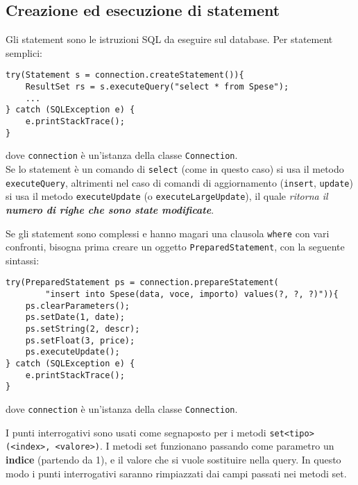 \documentclass[a4paper, 10pt, titlepage]{article}
\begin{document}
\subsection{Creazione ed esecuzione di statement}
Gli statement sono le istruzioni SQL da eseguire sul database. Per statement semplici:
\begin{lstlisting}
try(Statement s = connection.createStatement()){
	ResultSet rs = s.executeQuery("select * from Spese");
	...
} catch (SQLException e) {
	e.printStackTrace();
}
\end{lstlisting}
dove \lstinline|connection| è un'istanza della classe \lstinline|Connection|. \\
Se lo statement è un comando di \lstinline|select| (come in questo caso) si usa il metodo \lstinline|executeQuery|, altrimenti nel caso di comandi di aggiornamento (\lstinline|insert|, \lstinline|update|) si usa il metodo \lstinline|executeUpdate| (o \lstinline|executeLargeUpdate|), il quale \textit{ritorna il \textbf{numero di righe che sono state modificate}}.\medskip

Se gli statement sono complessi e hanno magari una clausola \lstinline|where| con vari confronti, bisogna prima creare un oggetto \lstinline|PreparedStatement|, con la seguente sintassi:

\begin{lstlisting}
try(PreparedStatement ps = connection.prepareStatement(
		"insert into Spese(data, voce, importo) values(?, ?, ?)")){	
	ps.clearParameters();	
	ps.setDate(1, date);
	ps.setString(2, descr);
	ps.setFloat(3, price);
	ps.executeUpdate();
} catch (SQLException e) {
	e.printStackTrace();
}
\end{lstlisting}
dove \lstinline|connection| è un'istanza della classe \lstinline|Connection|. 

I punti interrogativi sono usati come segnaposto per i metodi \lstinline|set<tipo>(<index>, <valore>)|.
I metodi set funzionano passando come parametro un \textbf{indice} (partendo da 1), e il valore che si vuole sostituire nella query.
In questo modo i punti interrogativi saranno rimpiazzati dai campi passati nei metodi set.
\end{document}
